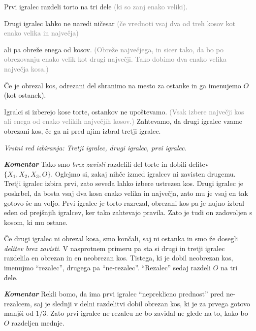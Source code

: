 \documentclass[a4paper,12pt]{article}
\begin{document}
\begin{protokol}

\item Prvi igralec razdeli torto na tri dele \textcolor{gray}{(ki so zanj enako veliki)}.

\item Drugi igralec lahko ne naredi ničesar \textcolor{gray}{(če vrednoti vsaj dva od treh kosov kot enako velika in največja)}

ali pa obreže enega od kosov. \textcolor{gray}{(Obreže največjega, in sicer tako, da bo po obrezovanju enako velik kot drugi največji. Tako dobimo dva enako velika največja kosa.)}

Če je obrezal kos, odrezani del shranimo na mesto za ostanke in ga imenujemo $O$ (kot ostanek).

\item Igralci si izberejo kose torte, ostankov ne upoštevamo. \textcolor{gray}{(Vsak izbere največji kos ali enega od enako velikih največjih kosov.)} Zahtevamo, da drugi igralec vzame obrezani kos, če ga ni pred njim izbral tretji igralec.

\textsl{Vrstni red izbiranja: Tretji igralec, drugi igralec, prvi igralec.}

\item [\textbf{\em Komentar}] Tako smo {\em brez zavisti} razdelili del torte in dobili delitev ${\{X_1, X_2, X_3, O\}}$. Oglejmo si, zakaj nihče izmed igralcev ni zavisten drugemu. Tretji igralec izbira prvi, zato seveda lahko izbere ustrezen kos. Drugi igralec je poskrbel, da bosta vsaj dva kosa enako velika in največja, zato mu je vsaj en tak gotovo še na voljo. Prvi igralec je torto razrezal, obrezani kos pa je nujno izbral eden od prejšnjih igralcev, ker tako zahtevajo pravila. Zato je tudi on zadovoljen s kosom, ki mu ostane.

\item Če drugi igralec ni obrezal kosa, smo končali, saj ni ostanka in smo že dosegli {\em delitev brez zavisti}. V nasprotnem primeru pa sta si drugi in tretji igralec razdelila en obrezan in en neobrezan kos. Tistega, ki je dobil neobrezan kos, imenujmo ``rezalec'', drugega pa ``ne-rezalec''. ``Rezalec'' sedaj razdeli $O$ na tri dele.

\item [\textbf{\em Komentar}] Rekli bomo, da ima prvi igralec ``nepreklicno prednost'' pred ne-rezalcem, saj je slednji v delni razdelitvi dobil obrezan kos, ki je za prvega gotovo manjši od $1/3$. Zato prvi igralec ne-rezalcu ne bo zavidal ne glede na to, kako bo $O$ razdeljen mednje.


\end{protokol}
\end{document}
